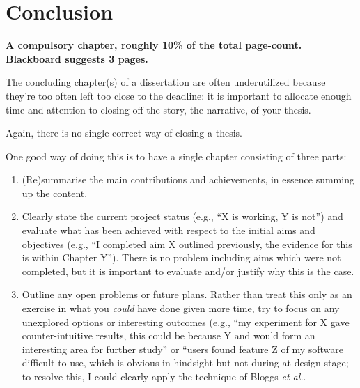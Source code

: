 \documentclass[ %
                    author={Revalda Putawara},
                supervisor={Dr. James Pope},
                    degree={MSc},
                     title={Robustness of Bayesian Neural Networks Design Choices Against Weight and Bias Perturbation Induced by Single Event Upsets (SEUs)},
                      type={},
                      year={2025}]{dissertation}
\begin{document}




\chapter{Conclusion}
\label{chap:conclusion}

\iffalse
{\bf A compulsory chapter,  roughly 10\% of the total page-count. Blackboard suggests 3 pages.}
\vspace{1cm} 

\noindent
The concluding chapter(s) of a dissertation are often underutilized because they're 
too often left too close to the deadline: it is important to allocate enough time and 
attention to closing off the story, the narrative, of your thesis.

Again, there is no single correct way of closing a thesis. 

One good way of doing this is to have a single chapter consisting of three parts:

\begin{enumerate}
\item (Re)summarise the main contributions and achievements, in essence
      summing up the content.
\item Clearly state the current project status (e.g., ``X is working, Y 
      is not'') and evaluate what has been achieved with respect to the 
      initial aims and objectives (e.g., ``I completed aim X outlined 
      previously, the evidence for this is within Chapter Y'').  There 
      is no problem including aims which were not completed, but it is 
      important to evaluate and/or justify why this is the case.
\item Outline any open problems or future plans.  Rather than treat this
      only as an exercise in what you {\em could} have done given more 
      time, try to focus on any unexplored options or interesting outcomes
      (e.g., ``my experiment for X gave counter-intuitive results, this 
      could be because Y and would form an interesting area for further 
      study'' or ``users found feature Z of my software difficult to use,
      which is obvious in hindsight but not during at design stage; to 
      resolve this, I could clearly apply the technique of Bloggs {\em et al.}.
\end{enumerate}
\end{document}
